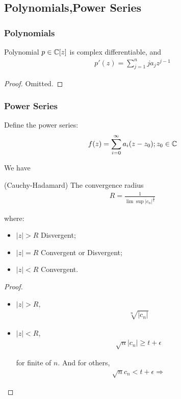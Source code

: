 \documentclass[Total.tex]{subfiles}
\begin{document}
			\subsection{Polynomials,Power Series}
			\subsubsection{Polynomials}
			\begin{proposition}
				Polynomial $p\in \mathbb{C}[z]$ is complex differentiable, and
				\begin{gather*}
					p'(z)=\sum _{j=1}^n j a_jz^{j-1}
				\end{gather*}
			\end{proposition}
			\begin{proof}
				Omitted.
			\end{proof}
			\subsubsection{Power Series}
			\begin{Def}
				Define the power series:
				\begin{gather*}
					f(z)=\sum_{i=0}^\infty a_i(z-z_0);z_0\in \mathbb{C}
				\end{gather*}
			\end{Def}
			We have
			\begin{proposition}
				(Cauchy-Hadamard) The convergence radius
				\begin{gather*}
					R=\frac{1}{\lim\sup|c_n|^\frac{1}{n}}
				\end{gather*}
				
				where:
				\begin{itemize}
					\item $|z|>R$ Disvergent;
					\item $|z|=R$ Convergent or Disvergent;
					\item $|z|<R$ Convergent.
				\end{itemize}
			\end{proposition}
			\begin{proof}
				\begin{itemize}
					\item $|z|>R$, 
					\begin{gather*}
						\sqrt[n]{|c_n|}
					\end{gather*}
					\item $|z|<R$,
					\begin{gather*}
						\sqrt{n}{|c_n|}\geq t+\epsilon
					\end{gather*}
					
					for finite of $n$. And for others,
					\begin{gather*}
						\sqrt{n}{c_n}<t+\epsilon\Rightarrow 
					\end{gather*}
				\end{itemize}
			\end{proof}
\end{document}
